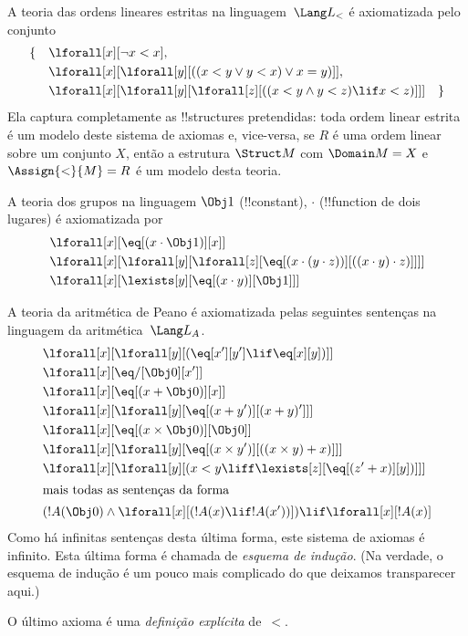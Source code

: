 \documentclass[../../../include/open-logic-section]{subfiles}
\begin{document}


\begin{ex}
A teoria das ordens lineares estritas na linguagem~$\Lang L_<$ é
axiomatizada pelo conjunto
\begin{align*}
\{\quad & \lforall[x][\lnot x < x], \\
& \lforall[x][\lforall[y][((x < y \lor y <
    x) \lor x = y)]], \\
& \lforall[x][\lforall[y][\lforall[z][((x < y
      \land y < z) \lif x < z)]]] \quad \}
\end{align*}
Ela captura completamente as !!{structure}s pretendidas: toda ordem linear
estrita é um modelo deste sistema de axiomas e, vice-versa, se $R$
é uma ordem linear sobre um conjunto $X$, então a estrutura $\Struct M$ com
$\Domain M = X$ e $\Assign{<}{M} = R$ é um modelo desta teoria.
\end{ex}

\begin{ex}
A teoria dos grupos na linguagem $\Obj 1$ (!!{constant}), $\cdot$
(!!{function} de dois lugares) é axiomatizada por
\begin{align*}
& \lforall[x][\eq[(x \cdot \Obj 1)][x]]\\
& \lforall[x][\lforall[y][\lforall[z][\eq[(x \cdot (y \cdot z))][((x
          \cdot y) \cdot z)]]]]\\
& \lforall[x][\lexists[y][\eq[(x \cdot y)][\Obj 1]]]
\end{align*}
\end{ex}

\begin{ex}
A teoria da aritmética de Peano é axiomatizada pelas seguintes
sentenças na linguagem da aritmética~$\Lang L_A$.
\begin{align*}
& \lforall[x][\lforall[y][(\eq[x'][y'] \lif \eq[x][y])]]\\
& \lforall[x][\eq/[\Obj 0][x']]\\
& \lforall[x][\eq[(x + \Obj 0)][x]]\\
& \lforall[x][\lforall[y][\eq[(x + y')][(x + y)']]]\\
& \lforall[x][\eq[(x \times \Obj 0)][\Obj 0]]\\
& \lforall[x][\lforall[y][\eq[(x \times y')][((x \times y) + x)]]]\\
& \lforall[x][\lforall[y][(x < y \liff \lexists[z][\eq[(z' + x)][y])]]]\\
\intertext{mais todas as sentenças da forma}
& (!A(\Obj 0) \land \lforall[x][(!A(x) \lif !A(x'))]) \lif \lforall[x][!A(x)]
\end{align*}
Como há infinitas sentenças desta última forma, este
sistema de axiomas é infinito.  Esta última forma é chamada de
\emph{esquema de indução}. (Na verdade, o esquema de indução é um pouco mais
complicado do que deixamos transparecer aqui.)

O último axioma é uma \emph{definição explícita} de~$<$.
\end{ex}
\end{document}
